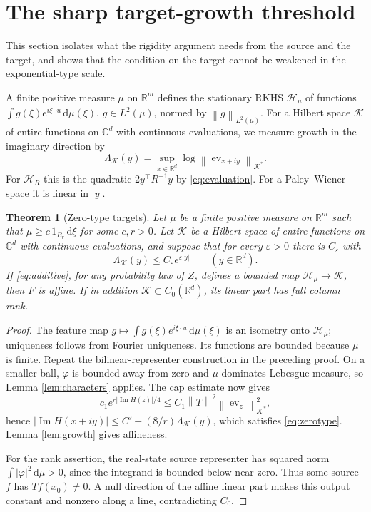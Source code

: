 \documentclass[11pt,a4paper]{article}
\newtheorem{theorem}{Theorem}[section]
\theoremstyle{remark}
\newcommand{\R}{\mathbb R}
\newcommand{\C}{\mathbb C}
\newcommand{\HH}{\mathcal H}
\newcommand{\dd}{\,\mathrm d}
\newcommand{\norm}[1]{\left\lVert#1\right\rVert}
\newcommand{\im}{\operatorname{Im}}
\begin{document}
\section{The sharp target-growth threshold}\label{sec:general}

This section isolates what the rigidity argument needs from the source
and the target, and shows that the condition on the target cannot be
weakened in the exponential-type scale.

A finite positive measure $\mu$ on $\R^m$ defines the stationary RKHS
$\HH_\mu$ of functions $\int g(\xi)e^{i\xi\cdot u}\dd\mu(\xi)$,
$g\in L^2(\mu)$, normed by $\norm{g}_{L^2(\mu)}$. For a Hilbert space
$\mathcal K$ of entire functions on $\C^d$ with continuous evaluations,
we measure growth in the imaginary direction by
\[
 \Lambda_{\mathcal K}(y)=\sup_{x\in\R^d}
 \log\norm{\operatorname{ev}_{x+iy}}_{\mathcal K^*}.
\]
For $\HH_R$ this is the quadratic $2y^\top R^{-1}y$ by
\eqref{eq:evaluation}. For a Paley--Wiener space it is linear in $|y|$.

\begin{theorem}[Zero-type targets]\label{thm:general}
Let $\mu$ be a finite positive measure on $\R^m$ such that
$\mu\ge c\,1_{B_r}\dd\xi$ for some $c,r>0$. Let $\mathcal K$ be a
Hilbert space of entire functions on $\C^d$ with continuous evaluations,
and suppose that for every $\varepsilon>0$ there is $C_\varepsilon$
with
\begin{equation}\label{eq:zerotypetarget}
 \Lambda_{\mathcal K}(y)\le C_\varepsilon e^{\varepsilon|y|}
 \qquad(y\in\R^d).
\end{equation}
If \eqref{eq:additive}, for any probability law of $Z$, defines a
bounded map $\HH_\mu\to\mathcal K$, then $F$ is affine. If in addition
$\mathcal K\subset C_0(\R^d)$, its linear part has full column rank.
\end{theorem}

\begin{proof}
The feature map $g\mapsto\int g(\xi)e^{i\xi\cdot u}\dd\mu(\xi)$
is an isometry onto $\HH_\mu$; uniqueness follows from Fourier
uniqueness. Its functions are bounded because $\mu$ is finite.
Repeat the bilinear-representer construction in the preceding proof.
On a smaller ball, $\varphi$ is bounded away from zero and $\mu$
dominates Lebesgue measure, so Lemma \ref{lem:characters} applies.
The cap estimate now gives
\[
 c_1e^{r|\im H(z)|/4}\le C_1\norm{T}^2
 \norm{\operatorname{ev}_z}^2_{\mathcal K^*},
\]
hence $|\im H(x+iy)|\le C'+(8/r)\Lambda_{\mathcal K}(y)$, which
satisfies \eqref{eq:zerotype}. Lemma \ref{lem:growth} gives
affineness.

For the rank assertion, the real-state source representer has
squared norm $\int|\varphi|^2\dd\mu>0$, since the integrand is
bounded below near zero. Thus some source $f$ has $Tf(x_0)\ne0$.
A null direction of the affine linear part makes this output
constant and nonzero along a line, contradicting $C_0$.
\end{proof}
\end{document}

